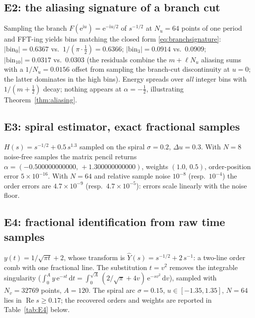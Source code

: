 \documentclass[11pt, a4paper]{article}
\theoremstyle{definition}
\theoremstyle{remark}
\newcommand{\dd}{\,\mathrm{d}}
\newcommand{\ii}{\mathrm{i}}
\newcommand{\ee}{\mathrm{e}}
\begin{document}
\subsection{E2: the aliasing signature of a branch cut}

Sampling the branch $F(\ee^{\ii u})=\ee^{-\ii u/2}$ of $s^{-1/2}$ at
$N_u=64$ points of one period and FFT-ing yields bins matching the
closed form \eqref{eq:branchsignature}: $|\mathrm{bin}_0|=0.6367$ vs.\
$1/(\pi\cdot\tfrac12)=0.6366$; $|\mathrm{bin}_3|=0.0914$ vs.\ $0.0909$;
$|\mathrm{bin}_{10}|=0.0317$ vs.\ $0.0303$ (the residuals combine the
$m+\ell N_u$ aliasing sums with a $1/N_u=0.0156$ offset from sampling the
branch-cut discontinuity at $u=0$; the latter dominates in the high bins).
Energy spreads over \emph{all} integer bins with $1/(m+\tfrac12)$ decay;
nothing appears at $\alpha=-\tfrac12$, illustrating
Theorem~\ref{thm:aliasing}.

\subsection{E3: spiral estimator, exact fractional samples}

$H(s)=s^{-1/2}+0.5\,s^{1.3}$ sampled on the spiral $\sigma=0.2$,
$\Delta u=0.3$. With $N=8$ noise-free samples the matrix pencil returns
$\alpha=(-0.500000000000,\,+1.300000000000)$, weights $(1.0, \,0.5)$,
order-position error $5\times10^{-16}$. With $N=64$ and relative sample
noise $10^{-8}$ (resp.\ $10^{-4}$) the order errors are
$4.7\times10^{-9}$ (resp.\ $4.7\times10^{-5}$): errors scale linearly with
the noise floor.

\subsection{E4: fractional identification from raw time samples}

$y(t)=1/\sqrt{\pi t}+2$, whose transform is
$\widehat{Y}(s)=s^{-1/2}+2\,s^{-1}$: a two-line order comb with one
fractional line. The substitution $t=v^{2}$ removes the integrable
singularity ($\int_0^{A}y\,\ee^{-st}\dd t=\int_0^{\sqrt A}(2/\sqrt\pi+4v)\,
\ee^{-sv^{2}}\dd v$), sampled with $N_v=32769$ points, $A=120$. The spiral
arc $\sigma=0.15$, $u\in[-1.35,1.35]$, $N=64$ lies in
$\operatorname{Re}s\ge0.17$; the recovered orders and weights are reported
in Table~\ref{tab:E4} below.
\end{document}
